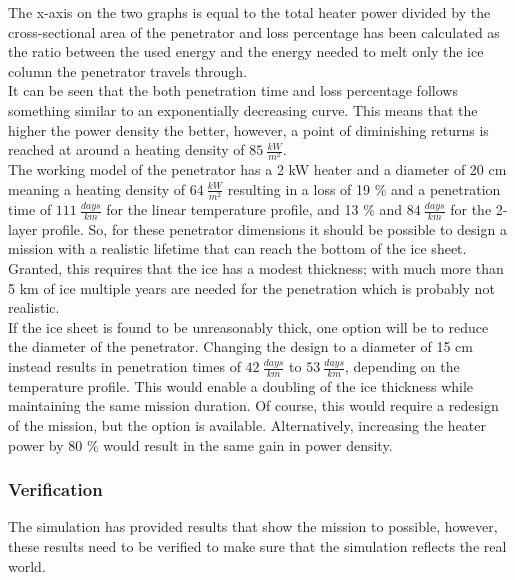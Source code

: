 \noindent
The x-axis on the two graphs is equal to the total heater power divided by the cross-sectional area of the penetrator and loss percentage has been calculated as the ratio between the used energy and the energy needed to melt only the ice column the penetrator travels through. \\

\noindent
It can be seen that the both penetration time and loss percentage follows something similar to an exponentially decreasing curve. This means that the higher the power density the better, however, a point of diminishing returns is reached at around a heating density of $\SI{85}{\frac{kW}{m^2}}$. \\

\noindent
The working model of the penetrator has a 2 kW heater and a diameter of 20 cm meaning a heating density of $\SI{64}{\frac{kW}{m^2}}$ resulting in a loss of 19 \% and a penetration time of $\SI{111}{\frac{days}{km}}$ for the linear temperature profile, and 13 \% and $\SI{84}{\frac{days}{km}}$ for the 2-layer profile. So, for these penetrator dimensions it should be possible to design a mission with a realistic lifetime that can reach the bottom of the ice sheet. Granted, this requires that the ice has a modest thickness; with much more than 5 km of ice multiple years are needed for the penetration which is probably not realistic.\\

\noindent
If the ice sheet is found to be unreasonably thick, one option will be to reduce the diameter of the penetrator. Changing the design to a diameter of 15 cm instead results in penetration times of $\SI{42}{\frac{days}{km}}$ to $\SI{53}{\frac{days}{km}}$, depending on the temperature profile. This would enable a doubling of the ice thickness while maintaining the same mission duration. Of course, this would require a redesign of the mission, but the option is available. Alternatively, increasing the heater power by 80 \% would result in the same gain in power density. 

\subsubsection{Verification}
The simulation has provided results that show the mission to possible, however, these results need to be verified to make sure that the simulation reflects the real world.\\

